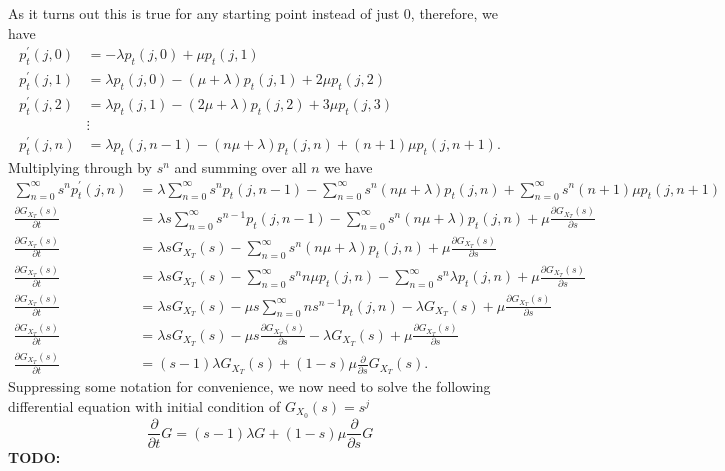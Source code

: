 \documentclass[10pt]{amsart}
\begin{document}
As it turns out this is true for any starting point instead of just 0, therefore, we have
\begin{align*}
p^\prime_t(j,0) &= -\lambda p_t(j,0) + \mu p_t(j,1) \\
p^\prime_t(j,1) &= \lambda p_t(j,0) - (\mu + \lambda) p_t(j,1) + 2\mu p_t(j,2) \\
p^\prime_t(j,2) &= \lambda p_t(j,1) - (2\mu + \lambda) p_t(j,2) + 3\mu p_t(j,3) \\
& \vdots \\
p^\prime_t(j,n) &= \lambda p_t(j,n-1) - (n\mu + \lambda) p_t(j,n) + (n + 1)\mu p_t(j,n+1).
\end{align*}
Multiplying through by $s^n$ and summing over all $n$ we have
\begin{align*}
\sum_{n=0}^\infty s^n p^\prime_t(j,n)
	&= \lambda \sum_{n=0}^\infty s^n p_t(j,n-1) - \sum_{n=0}^\infty s^n  (n\mu + \lambda) p_t(j,n) + \sum_{n=0}^\infty s^n (n + 1)\mu p_t(j,n+1) \\
\frac {\partial G_{X_T}(s)}{\partial t}
	&= \lambda s \sum_{n=0}^\infty s^{n - 1} p_t(j,n-1) - \sum_{n=0}^\infty s^n  (n\mu + \lambda) p_t(j,n) + \mu \frac {\partial G_{X_T}(s)}{\partial s} \\
\frac {\partial G_{X_T}(s)}{\partial t}
	&= \lambda s G_{X_T}(s) - \sum_{n=0}^\infty s^n  (n\mu + \lambda) p_t(j,n) + \mu \frac {\partial G_{X_T}(s)}{\partial s} \\
\frac {\partial G_{X_T}(s)}{\partial t}
	&= \lambda s G_{X_T}(s) - \sum_{n=0}^\infty s^n n\mu p_t(j,n) - \sum_{n=0}^\infty s^n \lambda p_t(j,n) + \mu \frac {\partial G_{X_T}(s)}{\partial s} \\
\frac {\partial G_{X_T}(s)}{\partial t}
	&= \lambda s G_{X_T}(s) - \mu s \sum_{n=0}^\infty ns^{n-1} p_t(j,n) - \lambda G_{X_T}(s) + \mu \frac {\partial G_{X_T}(s)}{\partial s} \\
\frac {\partial G_{X_T}(s)}{\partial t}
	&= \lambda s G_{X_T}(s) - \mu s \frac {\partial G_{X_T}(s)}{\partial s} - \lambda G_{X_T}(s) + \mu \frac {\partial G_{X_T}(s)}{\partial s} \\
\frac {\partial G_{X_T}(s)}{\partial t}
	&= (s - 1) \lambda G_{X_T}(s) + (1 - s)\mu \frac {\partial }{\partial s}G_{X_T}(s).
\end{align*}
Suppressing some notation for convenience, we now need to solve the following differential equation with initial condition of $G_{X_0}(s) = s^j$
$$
\frac {\partial}{\partial t} G
	= (s - 1) \lambda G + (1 - s)\mu \frac {\partial }{\partial s}G
$$
\textbf{TODO:} \\
\end{document}

